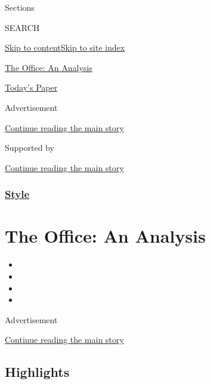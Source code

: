 Sections

SEARCH

\protect\hyperlink{site-content}{Skip to
content}\protect\hyperlink{site-index}{Skip to site index}

\href{https://www.nytimes.com/spotlight/the-office-an-analysis}{The
Office: An Analysis}

\href{https://myaccount.nytimes.com/auth/login?response_type=cookie\&client_id=vi}{}

\href{https://www.nytimes.com/section/todayspaper}{Today's Paper}

Advertisement

\protect\hyperlink{after-top}{Continue reading the main story}

Supported by

\protect\hyperlink{after-sponsor}{Continue reading the main story}

\hypertarget{style}{%
\subsubsection{\texorpdfstring{\href{/section/style}{Style}}{Style}}\label{style}}

\hypertarget{the-office-an-analysis}{%
\section{The Office: An Analysis}\label{the-office-an-analysis}}

\begin{itemize}
\item
\item
\item
\item
\end{itemize}

Advertisement

\protect\hyperlink{after-subheader}{Continue reading the main story}

\hypertarget{highlights}{%
\subsection{Highlights}\label{highlights}}

